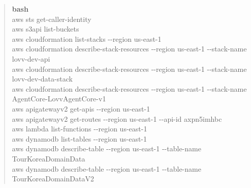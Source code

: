 \documentclass[12pt,a4paper]{article}
\newcommand{\DocNeedspace}[1]{\par\ifdim\dimexpr\pagegoal-\pagetotal\relax<#1\newpage\fi}
\begin{document}
\DocNeedspace{7\baselineskip}
\begin{quote}
\begin{scriptsize}
\ttfamily
\RaggedRight
\setlength{\parskip}{1pt}
\textcolor{LovvGreen}{\textbf{bash}}\\[0.2em]
aws sts get-\allowbreak{}caller-\allowbreak{}identity\\
aws s3api list-\allowbreak{}buckets\\
aws cloudformation list-\allowbreak{}stacks -\allowbreak{}-\allowbreak{}region us-\allowbreak{}east-\allowbreak{}1\\
aws cloudformation describe-\allowbreak{}stack-\allowbreak{}resources -\allowbreak{}-\allowbreak{}region us-\allowbreak{}east-\allowbreak{}1 -\allowbreak{}-\allowbreak{}stack-\allowbreak{}name lovv-\allowbreak{}dev-\allowbreak{}api\\
aws cloudformation describe-\allowbreak{}stack-\allowbreak{}resources -\allowbreak{}-\allowbreak{}region us-\allowbreak{}east-\allowbreak{}1 -\allowbreak{}-\allowbreak{}stack-\allowbreak{}name lovv-\allowbreak{}dev-\allowbreak{}data-\allowbreak{}stack\\
aws cloudformation describe-\allowbreak{}stack-\allowbreak{}resources -\allowbreak{}-\allowbreak{}region us-\allowbreak{}east-\allowbreak{}1 -\allowbreak{}-\allowbreak{}stack-\allowbreak{}name Agent\allowbreak{}Core-\allowbreak{}Lovv\allowbreak{}Agent\allowbreak{}Core-\allowbreak{}v1\\
aws apigatewayv2 get-\allowbreak{}apis -\allowbreak{}-\allowbreak{}region us-\allowbreak{}east-\allowbreak{}1\\
aws apigatewayv2 get-\allowbreak{}routes -\allowbreak{}-\allowbreak{}region us-\allowbreak{}east-\allowbreak{}1 -\allowbreak{}-\allowbreak{}api-\allowbreak{}id axpn5imhbc\\
aws lambda list-\allowbreak{}functions -\allowbreak{}-\allowbreak{}region us-\allowbreak{}east-\allowbreak{}1\\
aws dynamodb list-\allowbreak{}tables -\allowbreak{}-\allowbreak{}region us-\allowbreak{}east-\allowbreak{}1\\
aws dynamodb describe-\allowbreak{}table -\allowbreak{}-\allowbreak{}region us-\allowbreak{}east-\allowbreak{}1 -\allowbreak{}-\allowbreak{}table-\allowbreak{}name Tour\allowbreak{}Korea\allowbreak{}Domain\allowbreak{}Data\\
aws dynamodb describe-\allowbreak{}table -\allowbreak{}-\allowbreak{}region us-\allowbreak{}east-\allowbreak{}1 -\allowbreak{}-\allowbreak{}table-\allowbreak{}name Tour\allowbreak{}Korea\allowbreak{}Domain\allowbreak{}Data\allowbreak{}V2\\

\end{scriptsize}
\end{quote}
\end{document}
